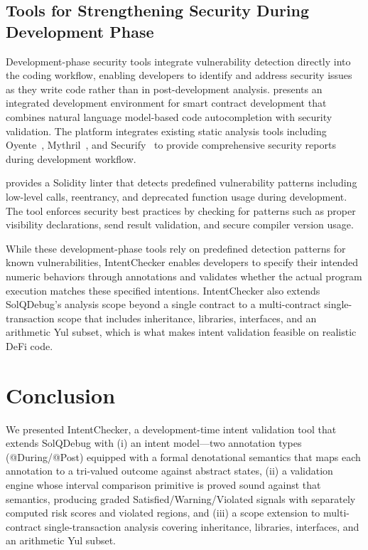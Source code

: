\documentclass[pdflatex,sn-basic]{sn-jnl}%
\theoremstyle{thmstyleone}%
\theoremstyle{thmstyletwo}%
\theoremstyle{thmstylethree}%
\begin{document}
\subsection{Tools for Strengthening Security During Development Phase}
Development-phase security tools integrate vulnerability detection directly into the coding workflow, enabling developers to identify and address security issues as they write code rather than in post-development analysis.
\citep{making} presents an integrated development environment for smart contract development that combines natural language model-based code autocompletion with security validation.
The platform integrates existing static analysis tools including Oyente~\citep{oyente}, Mythril~\citep{mythril}, and Securify~\citep{securify} to provide comprehensive security reports during development workflow.

\citep{solhint} provides a Solidity linter that detects predefined vulnerability patterns including low-level calls, reentrancy, and deprecated function usage during development.
The tool enforces security best practices by checking for patterns such as proper visibility declarations, send result validation, and secure compiler version usage.

While these development-phase tools rely on predefined detection patterns for known vulnerabilities,
IntentChecker enables developers to specify their intended numeric behaviors through annotations and validates whether the actual program execution matches these specified intentions.
IntentChecker also extends SolQDebug's analysis scope beyond a single contract to a multi-contract single-transaction scope that includes inheritance, libraries, interfaces, and an arithmetic Yul subset, which is what makes intent validation feasible on realistic DeFi code.

\section{Conclusion}\label{sec:conclusion}

We presented IntentChecker, a development-time intent validation tool that extends SolQDebug with (i) an intent model---two annotation types (@During/@Post) equipped with a formal denotational semantics that maps each annotation to a tri-valued outcome against abstract states, (ii) a validation engine whose interval comparison primitive is proved sound against that semantics, producing graded Satisfied/Warning/Violated signals with separately computed risk scores and violated regions, and (iii) a scope extension to multi-contract single-transaction analysis covering inheritance, libraries, interfaces, and an arithmetic Yul subset.
\end{document}
